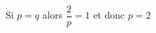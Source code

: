 \documentclass[preview]{standalone}
\begin{document}
\begin{center}
Si \(p = q\) alors \(\dfrac{2}{p} = 1\) et donc \(p = 2\)
\end{center}
\end{document}

